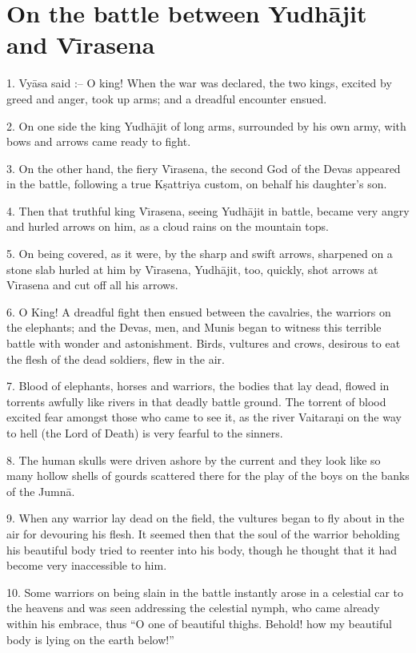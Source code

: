 \chapter{On the battle between Yudh\=ajit and V\={\i}rasena}

1. Vy\=asa said :-- O king! When the war was declared, the two kings, excited by greed and anger, took up arms; and a dreadful encounter ensued.

2. On one side the king Yudh\=ajit of long arms, surrounded by his own army, with bows and arrows came ready to fight.

3. On the other hand, the fiery V\={\i}rasena, the second God of the Devas appeared in the battle, following a true K\d{s}attriya custom, on behalf his daughter's son.

4. Then that truthful king V\={\i}rasena, seeing Yudh\=ajit in battle, became very angry and hurled arrows on him, as a cloud rains on the mountain tops.

5. On being covered, as it were, by the sharp and swift arrows, sharpened on a stone slab hurled at him by V\={\i}rasena, Yudh\=ajit, too, quickly, shot arrows at V\={\i}rasena and cut off all his arrows.

6. O King! A dreadful fight then ensued between the cavalries, the warriors on the elephants; and the Devas, men, and Munis began to witness this terrible battle with wonder and astonishment. Birds, vultures and crows, desirous to eat the flesh of the dead soldiers, flew in the air.

7. Blood of elephants, horses and warriors, the bodies that lay dead, flowed in torrents awfully like rivers in that deadly battle ground. The torrent of blood excited fear amongst those who came to see it, as the river Vaitara\d{n}i on the way to hell (the Lord of Death) is very fearful to the sinners.

8. The human skulls were driven ashore by the current and they look like so many hollow shells of gourds scattered there for the play of the boys on the banks of the Jumn\=a.

9. When any warrior lay dead on the field, the vultures began to fly about in the air for devouring his flesh. It seemed then that the soul of the warrior beholding his beautiful body tried to reenter into his body, though he thought that it had become very inaccessible to him.

10. Some warriors on being slain in the battle instantly arose in a celestial car to the heavens and was seen addressing the celestial nymph, who came already within his embrace, thus ``O one of beautiful thighs. Behold! how my beautiful body is lying on the earth below!''


